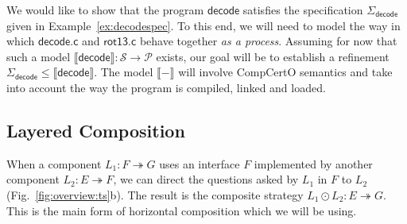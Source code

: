 \documentclass[acmsmall,screen,review,nonacm]{acmart}
\newcommand{\kw}[1]{\ensuremath{ \mathsf{#1} }}
\begin{document}

\begin{example} \label{ex:decodesim} %
We would like to show that the program $\kw{decode}$
satisfies the specification $\Sigma_\kw{decode}$
given in Example~\ref{ex:decodespec}.
To this end,
we will need to model the way in which
$\kw{decode.c}$ and $\kw{rot13.c}$ behave together
\emph{as a process}.
Assuming for now that such a model
$\llbracket \kw{decode} \rrbracket :
 \mathcal{S} \rightarrow \mathcal{P}$
exists,
our goal will be to establish a refinement
$
  \Sigma_\kw{decode}
  \le
  \llbracket \kw{decode} \rrbracket
$.
The model $\llbracket - \rrbracket$ will involve CompCertO semantics
and take into account the way the program is
compiled, linked and loaded.
\end{example}


\subsection{Layered Composition} %

When a component $L_1 : F \twoheadrightarrow G$
uses an interface $F$ implemented by
another component $L_2 : E \twoheadrightarrow F$,
we can direct the questions asked by $L_1$ in $F$ to $L_2$
(Fig.~\ref{fig:overview:ts}b).
The result is the composite strategy
$L_1 \odot L_2 : E \twoheadrightarrow G$. %
This is the main form of horizontal composition which we will be using.
\end{document}
